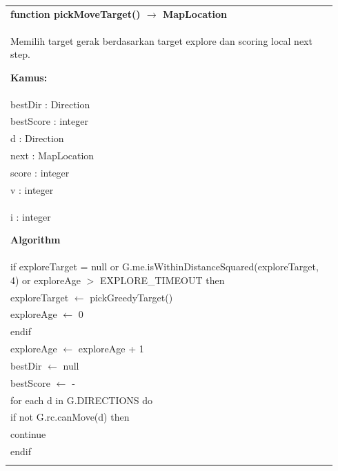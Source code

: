 \documentclass{article}
\newenvironment{pseudobox}
{
\centering
\begin{longtable}{|p{0.94\linewidth}|}
\hline
}
{
\\ \hline
\end{longtable}
\vspace{0.05cm}
}
\begin{document}
\begin{pseudobox}
\textbf{function pickMoveTarget() $\rightarrow$ MapLocation} \\
{ Memilih target gerak berdasarkan target explore dan scoring local next step. }

\textbf{Kamus:} \\
\hspace*{1em} bestDir : Direction \\
\hspace*{1em} bestScore : integer \\
\hspace*{1em} d : Direction \\
\hspace*{1em} next : MapLocation \\
\hspace*{1em} score : integer \\
\hspace*{1em} v : integer \\
\hspace*{1em} i : integer

\textbf{Algorithm} \\
\hspace*{1em} if exploreTarget = null or G.me.isWithinDistanceSquared(exploreTarget, 4) or exploreAge $>$ EXPLORE\_TIMEOUT then \\
\hspace*{2em} exploreTarget $\leftarrow$ pickGreedyTarget() \\
\hspace*{2em} exploreAge $\leftarrow$ 0 \\
\hspace*{1em} endif \\

\hspace*{1em} exploreAge $\leftarrow$ exploreAge + 1 \\
\hspace*{1em} bestDir $\leftarrow$ null \\
\hspace*{1em} bestScore $\leftarrow$ -\infty \\

\hspace*{1em} for each d in G.DIRECTIONS do \\
\hspace*{2em} if not G.rc.canMove(d) then \\
\hspace*{3em} continue \\
\hspace*{2em} endif \\


\end{pseudobox}
\end{document}
